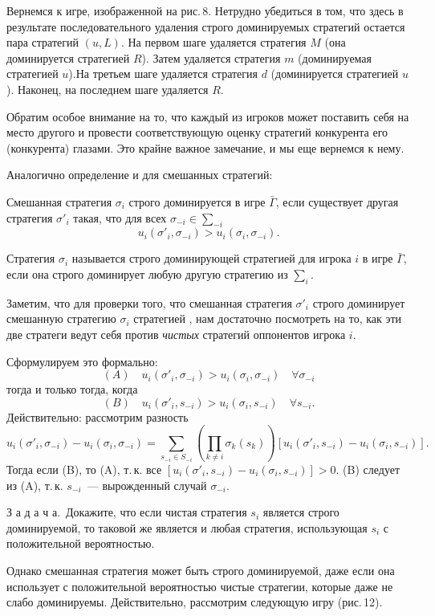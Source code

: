 Вернемся к игре, изображенной на рис.\,8. Нетрудно убедиться в том,
что здесь в результате последовательного удаления строго
доминируемых стратегий остается пара стратегий $(u,L)$. На первом
шаге удаляется стратегия $M$ (она доминируется стратегией $R$).
Затем удаляется стратегия $m$ (доминируемая стратегией $u$).На
третьем шаге удаляется стратегия $d$ (доминируется стратегией $u$).
Наконец, на последнем шаге удаляется $R$.

Обратим особое внимание на то, что каждый из игроков может
поставить себя на место другого и провести соответствующую оценку
стратегий конкурента его (конкурента) глазами. Это крайне важное
замечание, и мы еще вернемся к нему.

Аналогично определение и для смешанных стратегий:

\begin{definition}
Смешанная стратегия  $\sigma_i$ строго доминируется в игре
$\bar\Gamma$, если существует другая стратегия $\sigma'_i$ такая,
что для всех $\sigma_{-i}\in\sum_{-i}$
$$
u_i(\sigma'_i,\sigma_{-i})>u_i(\sigma_i,\sigma_{-i}).
$$
\end{definition}

Стратегия $\sigma_i$ называется строго доминирующей стратегией для
игрока $i$ в игре $\bar\Gamma$, если она строго доминирует любую
другую стратегию из $\sum_i$.

Заметим, что для проверки того, что смешанная стратегия $\sigma'_i$
строго доминирует смешанную стратегию $\sigma_i$ стратегией , нам
достаточно посмотреть на то, как эти две стратеги ведут себя против
{\it чистых} стратегий оппонентов игрока $i$.

Сформулируем это формально:
$$
(A)\quad u_i(\sigma'_i,\sigma_{-i})>u_i
(\sigma_i,\sigma_{-i})\quad\forall\sigma_{-i}
$$
тогда и только тогда, когда
$$
(B)\quad u_i(\sigma'_i,s_{-i})>u_i (\sigma_i,s_{-i})\quad\forall
s_{-i}.
$$
Действительно: рассмотрим разность
$$
u_i(\sigma'_i,\sigma_{-i})-u_i
(\sigma_i,\sigma_{-i})=\sum_{s_{-i}\in S_{-i}} (\prod_{k\ne
i}\sigma_k(s_k))[u_i (\sigma'_i,s_{-i})-u_i(\sigma_i,s_{-i})].
$$
Тогда если (B), то (A), т.\,к. все
$[u_i(\sigma'_i,s_{-i})-u_i(\sigma_i,s_{-i})]>0$.  (B) следует из
(A), т.\,к. $s_{-i}$~--- вырожденный случай $\sigma_{-i}$.

З а д а ч а.\, Докажите, что если чистая стратегия $s_i$ является
строго доминируемой, то таковой же является и любая стратегия,
использующая $s_i$ с положительной вероятностью.

Однако смешанная стратегия может быть строго доминируемой, даже если
она использует с положительной вероятностью чистые стратегии,
которые даже не слабо доминируемы. Действительно, рассмотрим
следующую игру (рис.\,12).


